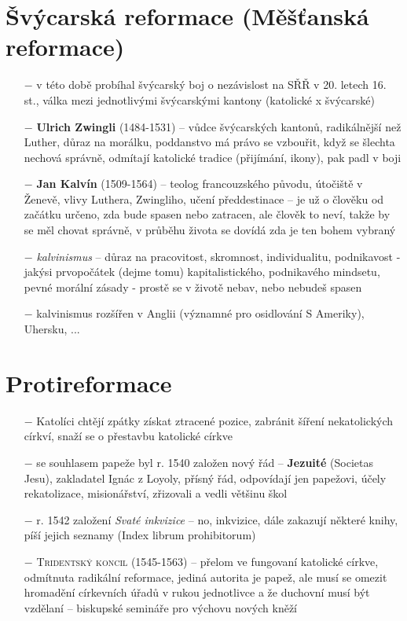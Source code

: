 \documentclass{article}
\begin{document}
\section*{Švýcarská reformace (Měšťanská reformace)}
\begin{itemize}
  \item[$-$] v této době probíhal švýcarský boj o nezávislost na SŘŘ v 20. letech 16. st., válka mezi jednotlivými švýcarskými kantony (katolické x švýcarské)
  \item[$-$] \textbf{Ulrich Zwingli} (1484-1531) -- vůdce švýcarských kantonů, radikálnější než Luther, důraz na morálku, poddanstvo má právo se vzbouřit, když se šlechta nechová správně, odmítají katolické tradice (přijímání, ikony), pak padl v boji
  \item[$-$] \textbf{Jan Kalvín} (1509-1564) -- teolog francouzského původu, útočiště v Ženevě, vlivy Luthera, Zwingliho, učení předdestinace -- je už o člověku od začátku určeno, zda bude spasen nebo zatracen, ale člověk to neví, takže by se měl chovat správně, v průběhu života se dovídá zda je ten bohem vybraný
  \item[$-$] \textit{kalvinismus} -- důraz na pracovitost, skromnost, individualitu, podnikavost - jakýsi prvopočátek (dejme tomu) kapitalistického, podnikavého mindsetu, pevné morální zásady - prostě se v životě nebav, nebo nebudeš spasen
  \item[$-$] kalvinismus rozšířen v Anglii (významné pro osidlování S Ameriky), Uhersku, ...
\end{itemize}

\section*{Protireformace}
\begin{itemize}
  \item[$-$] Katolíci chtějí zpátky získat ztracené pozice, zabránit šíření nekatolických církví, snaží se o přestavbu katolické církve
  \item[$-$] se souhlasem papeže byl r. 1540 založen nový řád -- \textbf{Jezuité} (Societas Jesu), zakladatel Ignác z Loyoly, přísný řád, odpovídají jen papežovi, účely rekatolizace, misionářství, zřizovali a vedli většinu škol
  \item[$-$] r. 1542 založení \textit{Svaté inkvizice} -- no, inkvizice, dále zakazují některé knihy, píší jejich seznamy (Index librum prohibitorum)
  \item[$-$] \textsc{Tridentský koncil} (1545-1563) -- přelom ve fungovaní katolické církve, odmítnuta radikální reformace, jediná autorita je papež, ale musí se omezit hromadění církevních úřadů v rukou jednotlivce a že duchovní musí být vzdělaní -- biskupské semináře pro výchovu nových kněží
\end{itemize}
\end{document}
